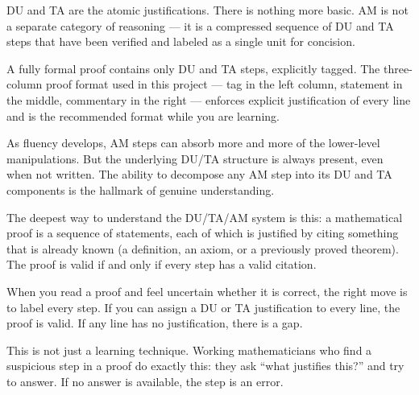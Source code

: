 \begin{remark}
DU and TA are the atomic justifications. There is nothing more basic.
AM is not a separate category of reasoning --- it is a compressed
sequence of DU and TA steps that have been verified and labeled as
a single unit for concision.

A fully formal proof contains only DU and TA steps, explicitly tagged.
The three-column proof format used in this project --- tag in the left
column, statement in the middle, commentary in the right --- enforces
explicit justification of every line and is the recommended format
while you are learning.

As fluency develops, AM steps can absorb more and more of the lower-level
manipulations. But the underlying DU/TA structure is always present,
even when not written. The ability to decompose any AM step into its
DU and TA components is the hallmark of genuine understanding.
\end{remark}

\begin{remark}
The deepest way to understand the DU/TA/AM system is this: a mathematical
proof is a sequence of statements, each of which is justified by citing
something that is already known (a definition, an axiom, or a previously
proved theorem). The proof is valid if and only if every step has a valid
citation.

When you read a proof and feel uncertain whether it is correct, the
right move is to label every step. If you can assign a DU or TA
justification to every line, the proof is valid. If any line has no
justification, there is a gap.

This is not just a learning technique. Working mathematicians who find
a suspicious step in a proof do exactly this: they ask ``what justifies
this?'' and try to answer. If no answer is available, the step is an error.
\end{remark}
